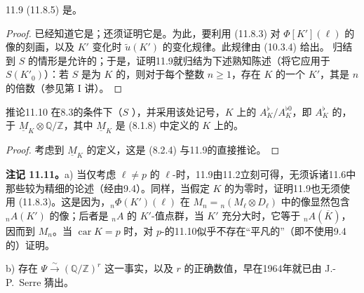 \begin{SGAresult}{}{11.9}
 (11.8.5) 是。
\end{SGAresult}
\begin{proof}
已经知道它是；还须证明它是。为此，要利用 (11.8.3) 对 $\Phi[K'](\ell)$ 的像的刻画，以及 $K'$ 变化时 $\widetilde u(K')$ 的变化规律。此规律由 (10.3.4) 给出。
归结到 $S$ 的情形是允许的；于是，证明11.9就归结为下述熟知陈述（将它应用于 $S(K'_0)$）：若 $S$ 是为 $K$ 的，则对于每个整数 $n\ge1$，存在 $K$ 的一个 $K'$，其是 $n$ 的倍数（参见第 I 讲）。
\end{proof}

\begin{SGAresult}{推论}{11.10}
在8.3的条件下（$S$ ），并采用该处记号，$K$ 上的 $A_K^\flat/A_K^{\flat0}$，即 $A_K^\flat$ 的，于 $\underline M_K\otimes\mathbb Q/\mathbb Z$，其中 $\underline M_K$ 是 (8.1.8) 中定义的 $K$ 上的。
\end{SGAresult}
\begin{proof}
考虑到 $\underline M_K$ 的定义，这是 (8.2.4) 与11.9的直接推论。
\end{proof}

\textbf{注记 11.11。}a) 当仅考虑 $\ell\ne p$ 的 $\ell$-时，11.9由11.2立刻可得，无须诉诸11.6中那些较为精细的论述（经由9.4）。同样，当假定 $K$ 的为零时，证明11.9也无须使用 (11.8.3)。这是因为，${}_n\Phi(K')(\ell)$ 在 $M_n={}_n(M_\ell\otimes D_\ell)$ 中的像显然包含 ${}_nA(K')$ 的像；后者是 ${}_nA$ 的 $K'$-值点群，当 $K'$ 充分大时，它等于 ${}_nA(\overline K)$，因而到 $M_n$。当 $\operatorname{car}K=p$ 时，对 $p$-的11.10似乎不存在“平凡的”（即不使用9.4的）证明。

b) 存在 $\Psi\xrightarrow{\sim}(\mathbb Q/\mathbb Z)^r$ 这一事实，以及 $r$ 的正确数值，早在1964年就已由 J.-P.~Serre 猜出。
